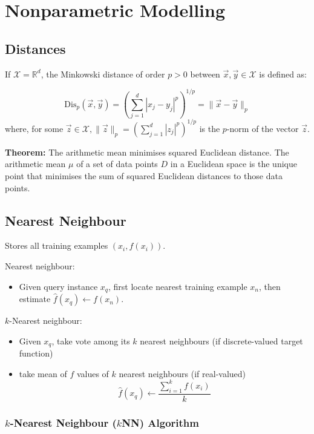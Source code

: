 \section{Nonparametric Modelling}

\subsection{Distances}

If \(\mathcal{X} = \mathbb{R}^d\), the Minkowski distance of order \(p > 0\) between \(\vec{x}, \vec{y} \in \mathcal{X}\) is defined as:

\[\mathrm{Dis}_p(\vec{x}, \vec{y}) = \left(\sum_{j = 1}^d |x_j - y_j|^p\right)^{1 / p} = \lVert \vec{x} - \vec{y}\rVert_p\]
where, for some \(\vec{z} \in \mathcal{X}, \lVert \vec{z} \rVert_p = \left(\sum_{j = 1}^d |z_j|^p\right)^{1/p}\) is the \(p\)-norm of the vector \(\vec{z}\).

\textbf{Theorem:} The arithmetic mean minimises squared Euclidean distance. The arithmetic mean \(\mu\) of a set of data points \(D\) in a Euclidean space is the unique point that minimises the sum of squared Euclidean distances to those data points.

\subsection{Nearest Neighbour}

Stores all training examples \((x_i, f(x_i))\).

Nearest neighbour:
\begin{itemize}
    \item Given query instance \(x_q\), first locate nearest training example \(x_n\), then estimate \(\hat{f}(x_q) \leftarrow f(x_n)\).
\end{itemize}

\(k\)-Nearest neighbour:
\begin{itemize}
    \item Given \(x_q\), take vote among its \(k\) nearest neighbours (if discrete-valued target function)
    \item take mean of \(f\) values of \(k\) nearest neighbours (if real-valued)
    \[\hat{f}(x_q) \leftarrow \frac{\sum_{i = 1}^k f(x_i)}{k}\]
\end{itemize}

\subsubsection{\(k\)-Nearest Neighbour (\(k\)NN) Algorithm}

